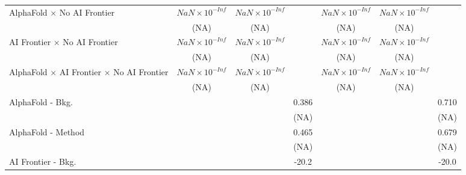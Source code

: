 \begin{tabular}{lcccccc}
   AlphaFold $\times$ No AI Frontier                                          & $NaN\times 10^{-Inf}$  & $NaN\times 10^{-Inf}$  &                        & $NaN\times 10^{-Inf}$  & $NaN\times 10^{-Inf}$  &   \\   
                                                                              & (NA)                   & (NA)                   &                        & (NA)                   & (NA)                   &   \\   
   AI Frontier $\times$ No AI Frontier                                        & $NaN\times 10^{-Inf}$  & $NaN\times 10^{-Inf}$  &                        & $NaN\times 10^{-Inf}$  & $NaN\times 10^{-Inf}$  &   \\   
                                                                              & (NA)                   & (NA)                   &                        & (NA)                   & (NA)                   &   \\   
   AlphaFold $\times$ AI Frontier $\times$ No AI Frontier                     & $NaN\times 10^{-Inf}$  & $NaN\times 10^{-Inf}$  &                        & $NaN\times 10^{-Inf}$  & $NaN\times 10^{-Inf}$  &   \\   
                                                                              & (NA)                   & (NA)                   &                        & (NA)                   & (NA)                   &   \\   
   AlphaFold - Bkg.                                                           &                        &                        & 0.386                  &                        &                        & 0.710\\   
                                                                              &                        &                        & (NA)                   &                        &                        & (NA)\\   
   AlphaFold - Method                                                         &                        &                        & 0.465                  &                        &                        & 0.679\\   
                                                                              &                        &                        & (NA)                   &                        &                        & (NA)\\   
   AI Frontier - Bkg.                                                         &                        &                        & -20.2                  &                        &                        & -20.0\\   

\end{tabular}
